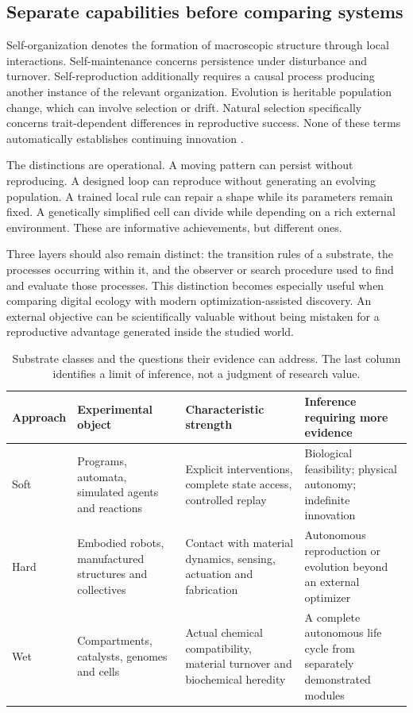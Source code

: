 \subsection{Separate capabilities before comparing systems}
Self-organization denotes the formation of macroscopic structure through local
interactions. Self-maintenance concerns persistence under disturbance and
turnover. Self-reproduction additionally requires a causal process producing
another instance of the relevant organization. Evolution is heritable population
change, which can involve selection or drift. Natural selection specifically
concerns trait-dependent differences in reproductive success. None of these terms
automatically establishes continuing innovation \citep{Taylor2016}.

The distinctions are operational. A moving pattern can persist without
reproducing. A designed loop can reproduce without generating an evolving
population. A trained local rule can repair a shape while its parameters remain
fixed. A genetically simplified cell can divide while depending on a rich
external environment. These are informative achievements, but different ones.

Three layers should also remain distinct: the transition rules of a substrate,
the processes occurring within it, and the observer or search procedure used to
find and evaluate those processes. This distinction becomes especially useful
when comparing digital ecology with modern optimization-assisted discovery.
An external objective can be scientifically valuable without being mistaken
for a reproductive advantage generated inside the studied world.

\begin{table}[htbp]
\centering\small
\caption{Substrate classes and the questions their evidence can address. The
last column identifies a limit of inference, not a judgment of research value.}
\begin{tabularx}{\textwidth}{@{}>{\raggedright\arraybackslash}p{17mm}YYY@{}}
\toprule
Approach & Experimental object & Characteristic strength & Inference requiring more evidence \\
\midrule
Soft & Programs, automata, simulated agents and reactions & Explicit interventions, complete state access, controlled replay & Biological feasibility; physical autonomy; indefinite innovation \\
Hard & Embodied robots, manufactured structures and collectives & Contact with material dynamics, sensing, actuation and fabrication & Autonomous reproduction or evolution beyond an external optimizer \\
Wet & Compartments, catalysts, genomes and cells & Actual chemical compatibility, material turnover and biochemical heredity & A complete autonomous life cycle from separately demonstrated modules \\
\bottomrule
\end{tabularx}
\label{tab:substrates}
\end{table}

